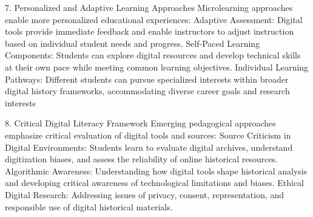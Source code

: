 7. Personalized and Adaptive Learning Approaches
Microlearning approaches \cite{trnds_ped} enable more personalized educational experiences:
Adaptive Assessment: Digital tools provide immediate feedback and enable instructors to adjust instruction based on individual student needs and progress.
Self-Paced Learning Components: Students can explore digital resources and develop technical skills at their own pace while meeting common learning objectives.
Individual Learning Pathways: Different students can pursue specialized interests within broader digital history frameworks, accommodating diverse career goals and research interests

8. Critical Digital Literacy Framework
Emerging pedagogical approaches emphasize critical evaluation of digital tools and sources:
Source Criticism in Digital Environments: Students learn to evaluate digital archives, understand digitization biases, and assess the reliability of online historical resources.
Algorithmic Awareness: Understanding how digital tools shape historical analysis and developing critical awareness of technological limitations and biases.
Ethical Digital Research: Addressing issues of privacy, consent, representation, and responsible use of digital historical materials.


